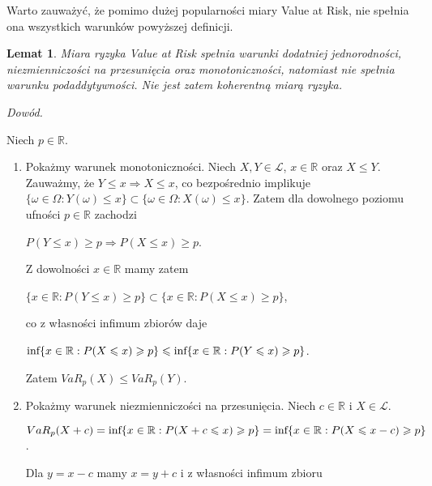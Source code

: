 \documentclass[12pt,a4paper,openany]{book}
\newtheorem{lm}[tw]{Lemat}
\begin{document}
Warto zauważyć, że pomimo dużej popularności miary Value at Risk, nie spełnia ona wszystkich warunków powyższej definicji.

\begin{lm}\*

\noindent Miara ryzyka Value at Risk spełnia warunki dodatniej jednorodności, niezmienniczości na przesunięcia oraz monotoniczności, natomiast nie spełnia warunku podaddytywności. Nie jest zatem koherentną miarą ryzyka.

\end{lm}

\newpage

\noindent \textit{Dowód.}

\noindent Niech $p \in \mathbb{R}$.
\begin{enumerate}
\item
\noindent Pokażmy warunek monotoniczności. Niech $X,Y \in \mathcal{L}$, $x \in \mathbb{R}$ oraz  $X \leqslant Y$.\\ 
\noindent Zauważmy, że $Y \leqslant x \Rightarrow X \leqslant x$, co bezpośrednio implikuje $\lbrace \omega \in \Omega: Y(\omega) \leqslant x \rbrace \subset {\lbrace \omega \in \Omega: X(\omega) \leqslant x}\rbrace$. Zatem dla dowolnego poziomu ufności $p \in \mathbb{R}$ zachodzi
\begin{center}
$P(Y \leqslant x) \geqslant p \Rightarrow P(X \leqslant x) \geqslant p$.
\end{center}
Z dowolności $x \in \mathbb{R}$ mamy zatem 
\begin{center}
$\lbrace x \in \mathbb{R}: P(Y \leqslant x) \geqslant p\rbrace \subset \lbrace x \in \mathbb{R}: P(X \leqslant x) \geqslant p \rbrace$,
\end{center}
co z własności infimum zbiorów daje
\begin{center}
$\textnormal{inf} \lbrace x \in \mathbb{R}: P(X \leqslant x) \geqslant p \rbrace \leqslant  \textnormal{inf} \lbrace x \in \mathbb{R}: P(Y \leqslant x) \geqslant p \rbrace$.
\end{center}
Zatem $VaR_{p}(X) \leqslant VaR_{p}(Y)$.
\item
\noindent Pokażmy warunek niezmienniczości na przesunięcia. Niech $c \in \mathbb{R}$ i $X \in \mathcal{L}$.
\begin{center}
$VaR_{p}(X + c) = \textnormal{inf} \lbrace x \in \mathbb{R}: P(X + c \leqslant x) \geqslant p \rbrace = \textnormal{inf} \lbrace x \in \mathbb{R}: P(X \leqslant x - c) \geqslant p \rbrace$.
\end{center}
Dla $ y = x-c$ mamy $x = y +c$ i z własności infimum zbioru

\end{enumerate}
\end{document}
